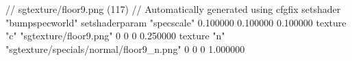 // sgtexture/floor9.png (117)
// Automatically generated using cfgfix
setshader "bumpspecworld"
setshaderparam "specscale" 0.100000 0.100000 0.100000
texture "c" "sgtexture/floor9.png" 0 0 0 0.250000
texture "n" "sgtexture/specials/normal/floor9_n.png" 0 0 0 1.000000

